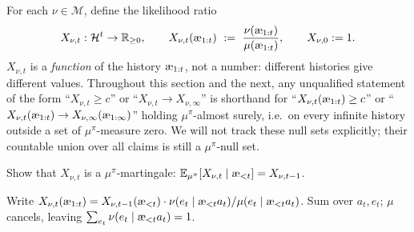 \documentclass[fontsize=11pt, parskip=half]{scrartcl}
\newcommand{\cH}{\mathcal{H}}
\newcommand{\cM}{\mathcal{M}}
\newcommand{\Ex}{\mathbb{E}}
\newcommand{\aes}{\textnormal{\ae}}
\begin{document}
For each $\nu \in \cM$, define the likelihood ratio
\[
    X_{\nu,t} : \cH^t \to \mathbb{R}_{\geq 0}, \qquad X_{\nu,t}(\aes_{1:t}) ~:=~ \frac{\nu(\aes_{1:t})}{\mu(\aes_{1:t})}, \qquad X_{\nu,0} := 1.
\]
$X_{\nu,t}$ is a \emph{function} of the history $\aes_{1:t}$, not a number: different histories give different values. Throughout this section and the next, any unqualified statement of the form ``$X_{\nu,t} \geq c$'' or ``$X_{\nu,t} \to X_{\nu,\infty}$'' is shorthand for ``$X_{\nu,t}(\aes_{1:t}) \geq c$'' or ``$X_{\nu,t}(\aes_{1:t}) \to X_{\nu,\infty}(\aes_{1:\infty})$'' holding $\mu^\pi$-almost surely, i.e.\ on every infinite history outside a set of $\mu^\pi$-measure zero. We will not track these null sets explicitly; their countable union over all claims is still a $\mu^\pi$-null set.

\begin{exercise}
\label{prob:martingale}
Show that $X_{\nu,t}$ is a $\mu^\pi$-martingale: $\Ex_{\mu^\pi}[X_{\nu,t} \mid \aes_{<t}] = X_{\nu,t-1}$.


\begin{hint}
Write $X_{\nu,t}(\aes_{1:t}) = X_{\nu,t-1}(\aes_{<t}) \cdot \nu(e_t \mid \aes_{<t} a_t)/\mu(e_t \mid \aes_{<t} a_t)$. Sum over $a_t, e_t$; $\mu$ cancels, leaving $\sum_{e_t} \nu(e_t \mid \aes_{<t} a_t) = 1$.
\end{hint}
\end{exercise}
\end{document}
